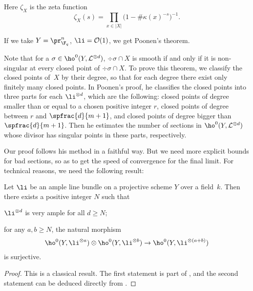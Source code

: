 Here $\zeta_X$ is the zeta function
\[
\zeta_X(s)=\prod_{x\in |X|}\big(1-\#\kappa(x)^{-s}\big)^{-1}.
\]

\begin{rmq}
If we take $Y=\pr^n_{\F_q}$, $\li=\mathcal{O}(1)$, we get Poonen's theorem.
\end{rmq}

Note that for a $\sigma\in \ho^0(Y, \mathcal{L}^{\otimes{d}})$, $\div \sigma\cap X$ is smooth if and only if it is non-singular at every closed point of $\div \sigma\cap X$. To prove this theorem, we classify the closed points of~$X$ by their degree, so that for each degree there exist only finitely many closed points. In Poonen's proof, he classifies the closed points into three parts for each $\li^{\otimes d}$, which are the following: closed points of degree smaller than or equal to a chosen positive integer $r$, closed points of degree between $r$ and $\spfrac{d}{m+1}$, and closed points of degree bigger than $\spfrac{d}{m+1}$. Then he estimates the number of sections in $\ho^0(Y, \mathcal{L}^{\otimes d})$ whose divisor has singular points in these parts, respectively.

Our proof follows his method in a faithful way. But we need more explicit bounds for bad sections, so as to get the speed of convergence for the final limit. For technical reasons, we need the following result:
\begin{lem}\label{ample}
Let $\li$ be an ample line bundle on a projective scheme $Y$ over a field~$k$. Then there exists a positive integer $N$ such that
\begin{enumeratei}
\item $\li^{\otimes d}$ is very ample for all $d\geq N$;
\item for any $a, b\geq N$, the natural morphism
\[
\ho^0(Y,\li^{\otimes a})\otimes \ho^0(Y,\li^{\otimes b})\to \ho^0(Y,\li^{\otimes (a+b)})
\]
is surjective.
\end{enumeratei}
\end{lem}
\begin{proof}
This is a classical result. The first statement is part of \cite[Th.\,1.2.6]{La04}, and the second statement can be deduced directly from \cite[Th.\,1.8.3]{La04}.
\end{proof}

